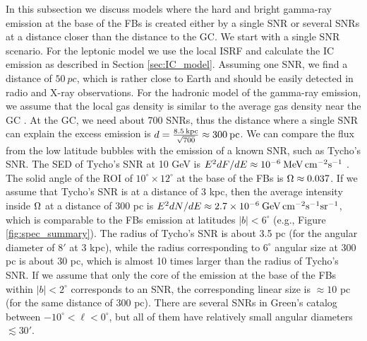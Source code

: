In this subsection we discuss models where the hard and bright gamma-ray emission at the base of the FBs is created either by a single SNR
or several SNRs at a distance closer than the distance to the GC.
We start with a single SNR scenario.
For the leptonic model we use the local ISRF and calculate the IC emission as described in Section \ref{sec:IC_model}.
Assuming one SNR, we find a distance of $\SI{50}{pc}$, which is rather close to Earth and should 
be easily detected in radio and X-ray observations.
For the hadronic model of the gamma-ray emission, we assume that 
the local gas density is similar to the average gas density near the GC \citep{2017ApJ...834...57M}.
At the GC, we need about 700 SNRs, thus the distance where a single SNR can explain the excess emission
is $d = \frac{8.5\: {\rm kpc}}{\sqrt{700}} \approx 300\:{\rm pc}$.
We can compare the flux from the low latitude bubbles with the emission of a known SNR, such as Tycho's SNR.
The SED of Tycho's SNR at 10 GeV is $E^2 {dF}/{dE} \approx 10^{-6}\: {\rm MeV\, cm^{-2} s^{-1}}$ \citep{2017ApJ...836...23A}.
The solid angle of the ROI of $10^\circ \times 12^\circ$ at the base of the FBs is $\Omega \approx 0.037$.
If we assume that Tycho's SNR is at a distance of 3 kpc, then the average intensity inside $\Omega$ at a distance of 300 pc
is $E^2 {dN}/{dE} \approx 2.7 \times 10^{-6}\: {\rm GeV\, cm^{-2} s^{-1} sr^{-1}}$, which is comparable to the 
FBs emission at latitudes $|b| < 6^\circ$ (e.g., Figure \ref{fig:spec_summary}).
The radius of Tycho's SNR is about 3.5 pc (for the angular diameter of $8'$ at 3 kpc),
while the radius corresponding to $6^\circ$ angular size at 300 pc is about 30 pc, which is almost 10 times larger than the radius of Tycho's SNR.
If we assume that only the core of the emission at the base of the FBs within $|b| < 2^\circ$ corresponds to an SNR,
the corresponding linear size is $\approx 10$ pc (for the same distance of 300 pc).
There are several SNRs in Green's catalog \citep{2014BASI...42...47G, 2017Green} between $-10^\circ < \ell < 0^\circ$,
but all of them have relatively small angular diameters $ \lesssim 30'$.

